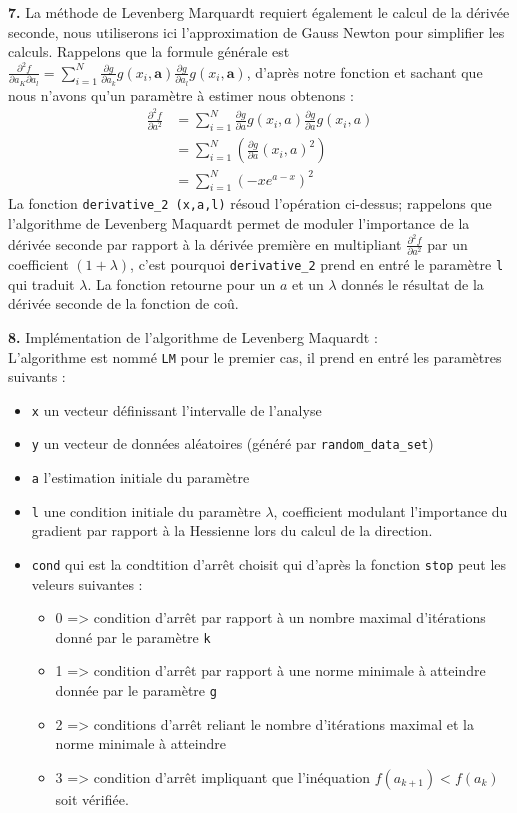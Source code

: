 \documentclass[12pt]{article}
\begin{document}
\textbf{\color{brick}7.} La méthode de Levenberg Marquardt requiert également le calcul de la dérivée seconde, nous utiliserons ici l'approximation de Gauss Newton pour simplifier les calculs. Rappelons que la formule générale est $\frac{\partial ^2 f }{\partial a_K \partial a_l} = \sum_{i=1}^N \frac{\partial g}{\partial a_k}g(x_i, \textbf{a})\frac{\partial g}{\partial a_l}g(x_i, \textbf{a})$, d'après notre fonction et sachant que nous n'avons qu'un paramètre à estimer nous obtenons :\\ 
\begin{align*}
    \frac{\partial ^2 f }{\partial a ^2} &=  \sum_{i=1}^N \frac{\partial g}{\partial a}g(x_i, a)\frac{\partial g}{\partial a}g(x_i, a)\\
    &= \sum_{i=1}^N ( \frac{\partial g}{\partial a}(x_i, a)^2) \\
    &=  \sum_{i=1}^N (-xe^{a-x})^2
\end{align*}
La fonction \verb|derivative_2 (x,a,l)| résoud l'opération ci-dessus; rappelons que l'algorithme de Levenberg Maquardt permet de moduler l'importance de la dérivée seconde par rapport à la dérivée première en multipliant $ \frac{\partial ^2 f }{\partial a ^2} $ par un coefficient $(1+ \lambda)$, c'est pourquoi  \verb|derivative_2| prend en entré le paramètre \verb|l| qui traduit $\lambda$. La fonction  retourne pour un $a$ et un $\lambda$ donnés le résultat de la dérivée seconde de la fonction de coû.

\textbf{\color{brick}8.} Implémentation de l'algorithme de Levenberg Maquardt :\\
L'algorithme  est nommé \verb|LM| pour le premier cas, il prend en entré les paramètres suivants :
\begin{itemize}
    \item \verb|x| un vecteur définissant l'intervalle de l'analyse
    \item \verb|y| un vecteur de données aléatoires (généré par \verb|random_data_set|)
    \item \verb|a| l'estimation initiale du paramètre
    \item \verb|l| une condition initiale du paramètre $\lambda$, coefficient modulant l'importance du gradient par rapport à la Hessienne lors du calcul de la direction.
    \item\verb|cond| qui est la condtition d'arrêt choisit qui d'après la fonction \verb|stop| peut les veleurs suivantes :
    \begin{itemize}
        \item 0 => condition d'arrêt par  rapport à un nombre maximal d'itérations donné par le paramètre \verb|k|
        \item 1 => condition d'arrêt par rapport à une norme minimale à atteindre donnée par le paramètre \verb|g|
        \item 2 => conditions d'arrêt reliant le nombre d'itérations maximal et la norme minimale à atteindre
        \item 3 => condition d'arrêt impliquant que l'inéquation $f(a_{k+1})<f(a_k)$ soit vérifiée.
    \end{itemize}
\end{itemize}
\end{document}
